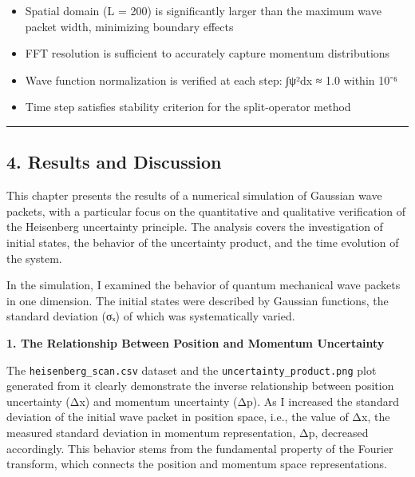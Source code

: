 \documentclass[
]{article}
\providecommand{\tightlist}{%
  \setlength{\itemsep}{0pt}\setlength{\parskip}{0pt}}
\begin{document}
\begin{itemize}
\tightlist
\item
  Spatial domain (L = 200) is significantly larger than the maximum wave
  packet width, minimizing boundary effects
\item
  FFT resolution is sufficient to accurately capture momentum
  distributions
\item
  Wave function normalization is verified at each step:
  ∫\textbar ψ\textbar²dx ≈ 1.0 within 10⁻⁶
\item
  Time step satisfies stability criterion for the split-operator method
\end{itemize}

\begin{center}\rule{0.5\linewidth}{0.5pt}\end{center}

\subsection{4. Results and Discussion}\label{results-and-discussion}

This chapter presents the results of a numerical simulation of Gaussian
wave packets, with a particular focus on the quantitative and
qualitative verification of the Heisenberg uncertainty principle. The
analysis covers the investigation of initial states, the behavior of the
uncertainty product, and the time evolution of the system.

In the simulation, I examined the behavior of quantum mechanical wave
packets in one dimension. The initial states were described by Gaussian
functions, the standard deviation (σₓ) of which was systematically
varied.

\textbf{1. The Relationship Between Position and Momentum Uncertainty}

The \texttt{heisenberg\_scan.csv} dataset and the
\texttt{uncertainty\_product.png} plot generated from it clearly
demonstrate the inverse relationship between position uncertainty (Δx)
and momentum uncertainty (Δp). As I increased the standard deviation of
the initial wave packet in position space, i.e., the value of Δx, the
measured standard deviation in momentum representation, Δp, decreased
accordingly. This behavior stems from the fundamental property of the
Fourier transform, which connects the position and momentum space
representations.
\end{document}
